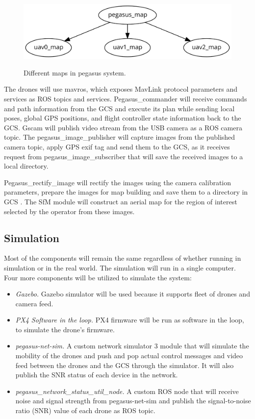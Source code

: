 \begin{figure}
	\centering
	\caption[Different maps in pegasus system.]{\small Different maps in pegasus system.}
	\includegraphics[width=5in]{figures/methodology/map-transformation-heirarichy}
	\label{fig:map-heirarichy}
\end{figure}


The drones will use mavros, which exposes MavLink protocol parameters and services as ROS topics and services. Pegasus\_commander will receive commands and path information from the GCS and execute its plan while sending local poses, global GPS positions, and flight controller state information back to the GCS. Gscam will publish video stream from the USB camera as a ROS camera topic. The pegasus\_image\_publisher will capture images from the published camera topic, apply GPS exif tag and send them to the GCS, as it receives request from pegasus\_image\_subscriber that will save the received images to a local directory. 

Pegasus\_rectify\_image will rectify the images using the camera calibration parameters, prepare the images for map building and save them to a directory in GCS . The SfM module will construct an aerial map for the region of interest selected by the operator from these images.


\subsection{Simulation}

Most of the components will remain the same regardless of whether running in simulation or in the real world. The simulation will run in a single computer. Four more components will be utilized to simulate the system:
\begin{itemize}
	\item \textit{Gazebo.} Gazebo simulator will be used because it supports fleet of drones and camera feed.
	\item \textit{PX4 Software in the loop.} PX4 firmware will be run as software in the loop, to simulate the drone's firmware. 
	\item \textit{pegasus-net-sim.} A custom network simulator 3 module that will simulate the mobility of the drones and push and pop actual control messages and video feed between the drones and the GCS through the simulator. It will also publish the SNR status of each device in the network.
	\item \textit{pegasus\_network\_status\_util\_node.} A custom ROS node that will receive noise and signal strength from pegasus-net-sim and publish the signal-to-noise ratio (SNR) value of each drone as ROS topic.
\end{itemize}


